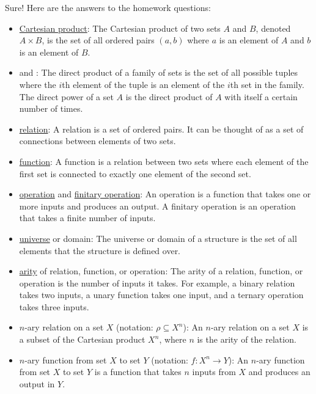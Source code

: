 Sure! Here are the answers to the homework questions:

\begin{itemize}
\item \href{http://en.wikipedia.org/wiki/Cartesian_product}{Cartesian product}: The Cartesian product of two sets $A$ and $B$, denoted $A \times B$, is the set of all ordered pairs $(a, b)$ where $a$ is an element of $A$ and $b$ is an element of $B$.
\item \href{http://en.wikipedia.org/wiki/Direct_product}{} and : The direct product of a family of sets is the set of all possible tuples where the $i$th element of the tuple is an element of the $i$th set in the family. The direct power of a set $A$ is the direct product of $A$ with itself a certain number of times.
\item \href{http://en.wikipedia.org/wiki/Finitary_relation}{relation}: A relation is a set of ordered pairs. It can be thought of as a set of connections between elements of two sets.
\item \href{http://en.wikipedia.org/wiki/Function_(mathematics)}{function}: A function is a relation between two sets where each element of the first set is connected to exactly one element of the second set.
\item \href{http://en.wikipedia.org/wiki/Operation_(mathematics)}{operation} and \href{http://en.wikipedia.org/wiki/Finitary}{finitary operation}: An operation is a function that takes one or more inputs and produces an output. A finitary operation is an operation that takes a finite number of inputs.
\item \href{http://en.wikipedia.org/wiki/Structure_(mathematical_logic)#Domain}{universe} or domain: The universe or domain of a structure is the set of all elements that the structure is defined over.
\item \href{http://en.wikipedia.org/wiki/Arity}{arity} of relation, function, or operation: The arity of a relation, function, or operation is the number of inputs it takes. For example, a binary relation takes two inputs, a unary function takes one input, and a ternary operation takes three inputs.
\item $n$-ary relation on a set $X$ (notation: $\rho \subseteq X^n$): An $n$-ary relation on a set $X$ is a subset of the Cartesian product $X^n$, where $n$ is the arity of the relation.
\item $n$-ary function from set $X$ to set $Y$ (notation: $f: X^n \rightarrow Y$): An $n$-ary function from set $X$ to set $Y$ is a function that takes $n$ inputs from $X$ and produces an output in $Y$.

\end{itemize}

